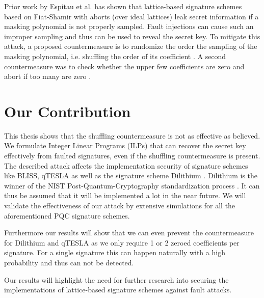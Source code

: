 Prior work by Espitau et al. \cite{espitau} has shown that lattice-based signature schemes based on Fiat-Shamir with aborts (over ideal lattices) leak secret information if a masking polynomial is not properly sampled. Fault injections can cause such an improper sampling and thus can be used to reveal the secret key. To mitigate this attack, a proposed countermeasure is to randomize the order the sampling of the masking polynomial, i.e. shuffling the order of its coefficient \cite[p.~155]{espitau}. A second countermeasure was to check whether the upper few coefficients are zero and abort if too many are zero  \cite[p.~155]{espitau}. 

\section{Our Contribution}
This thesis shows that the shuffling countermeasure is not as effective as believed. We formulate Integer Linear Programs (ILPs) that can recover the secret key effectively from faulted signatures, even if the shuffling countermeasure is present. The described attack affects the implementation security of signature schemes like BLISS, qTESLA as well as the signature scheme Dilithium \cite{bliss,qtesla,dilithium}.
Dilithium is the winner of the NIST Post-Quantum-Cryptography standardization process \cite{niststatus}.  It can thus be assumed that it will be implemented a lot in the near future.
We will validate the effectiveness of our attack by extensive simulations for all the aforementioned PQC signature schemes.

Furthermore our results will show that we can even prevent the  countermeasure for Dilithium and qTESLA as we only require 1 or 2 zeroed coefficients per signature. For a single signature this can happen naturally with a high probability and thus can not be detected.

Our results will highlight the need for further research into securing the implementations of lattice-based signature schemes against fault attacks.